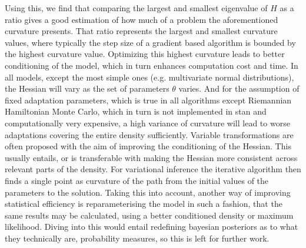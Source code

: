Using this, we find that comparing the largest and smallest eigenvalue of $H$ as a ratio gives a good estimation of how much of a problem the aforementioned curvature presents. That ratio represents the largest and smallest curvature values, where typically the step size of a gradient based algorithm is bounded by the highest curvature value. Optimizing this highest curvature leads to better conditioning of the model, which in turn enhances computation cost and time. In all models, except the most simple ones (e.g. multivariate normal distributions), the Hessian will vary as the set of parameters $\theta$ varies. And for the assumption of fixed adaptation parameters, which is true in all algorithms except Riemannian Hamiltonian Monte Carlo, which in turn is not implemented in stan and computationally very expensive, a high variance of curvature will lead to worse adaptations covering the entire density sufficiently. Variable transformations are often proposed with the aim of improving the conditioning of the Hessian. This usually entails, or is transferable with making the Hessian more consistent across relevant parts of the density. For variational inference the iterative algorithm then finds a single point as curvature of the path from the initial values of the parameters to the solution. Taking this into account, another way of improving statistical efficiency is reparameterising the model in such a fashion, that the same results may be calculated, using a better conditioned density or maximum likelihood. Diving into this would entail redefining bayesian posteriors as to what they technically are, probability measures, so this is left for further work. 